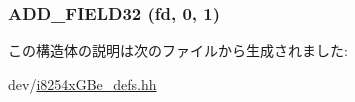 \label{structiGbReg_1_1Regs_1_1CTRL_ac09b887111c3854f969a8fca713f6e1d}
\hypertarget{structiGbReg_1_1Regs_1_1CTRL_a03e5dea6349337c8756f6003f2d02adc}{
\subsubsection[{ADD\_\-FIELD32}]{\setlength{\rightskip}{0pt plus 5cm}ADD\_\-FIELD32 (fd, \/  0, \/  1)}}
\label{structiGbReg_1_1Regs_1_1CTRL_a03e5dea6349337c8756f6003f2d02adc}


この構造体の説明は次のファイルから生成されました:\begin{DoxyCompactItemize}
\item 
dev/\hyperlink{i8254xGBe__defs_8hh}{i8254xGBe\_\-defs.hh}\end{DoxyCompactItemize}
